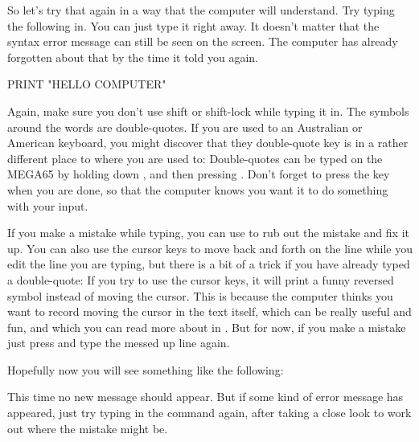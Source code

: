 \needspace{4cm} %

So let's try that again in a way that the computer will understand.  Try typing
  the following in.  You can just type it right away. It doesn't matter that the
  syntax error message can still be seen on the screen.  The computer has already
  forgotten about that by the time it told you  again.

\begin{screenoutput}
PRINT "HELLO COMPUTER"
\end{screenoutput}

Again, make sure you don't use shift or shift-lock while typing it in.  The symbols around
the words  are double-quotes.  If you are used to an Australian or American
keyboard, you might discover that they double-quote key is in a rather different place to
where you are used to:  Double-quotes can be typed on the MEGA65 by holding down
, and then pressing .  Don't forget to press the 
key when you are done, so that the computer knows you want it to do something with your input.

If you make a mistake while typing, you can use  to rub out the mistake
and fix it up.  You can also use the cursor keys to move back and forth on the line while
you edit the line you are typing, but there is a bit of a trick if you have already typed
a double-quote: If you try to use the cursor keys, it will print a funny reversed symbol
instead of moving the cursor.  This is because the computer thinks you want to record
moving the cursor in the text itself, which can be really useful and fun, and which you can
read more about in . But for now, if you
make a mistake just press  and type the messed up line again.

\needspace{4cm} %
Hopefully now you will see something like the following:


  This time no new  message should appear. But if some kind
  of error message has appeared, just try typing in the command again, after
  taking a close look to work out where the mistake might be.

